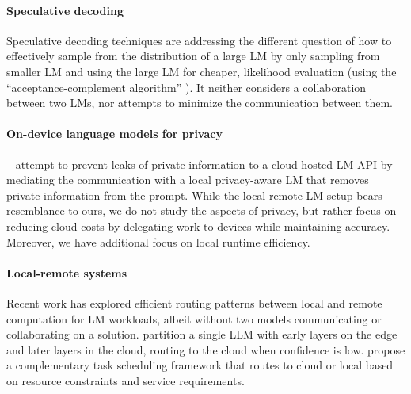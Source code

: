 \paragraph{Speculative decoding}
Speculative decoding \citep{leviathan2023fast,zhang2024fast,chen2024sequoia} techniques are addressing the different question of how to effectively sample from the distribution of a large LM by only sampling from smaller LM and using the large LM for cheaper, likelihood evaluation (using the ``acceptance-complement algorithm'' \citep{devroye2006nonuniform}). It neither considers a collaboration between two LMs, nor attempts to minimize the communication between them.


\paragraph{On-device language models for privacy}
~\citet{siyan2024papillon, zhang2024cogenesis} attempt to prevent leaks of private information to a cloud-hosted LM API by mediating the communication with a local privacy-aware LM that removes private information from the prompt. While the local-remote LM setup bears resemblance to ours, we do not study the aspects of privacy, but rather focus on reducing cloud costs by delegating work to devices while maintaining accuracy. Moreover, we have additional focus on local runtime efficiency.

\paragraph{Local-remote systems} Recent work has explored efficient routing patterns between local and remote computation for LM workloads, albeit without two models communicating or collaborating on a solution.
\citep{jin2024collm} partition a single LLM with early layers on the edge and later layers in the cloud, routing to the cloud when confidence is low. \citep{yang2024perllm}
propose a complementary task scheduling framework that routes to cloud or local based on resource constraints and service requirements.


